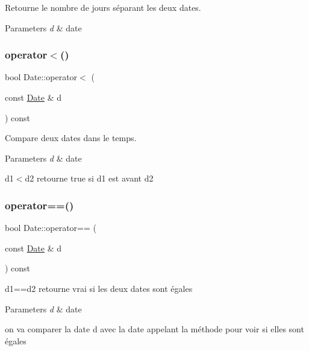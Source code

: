 Retourne le nombre de jours séparant les deux dates. 


\begin{DoxyParams}{Parameters}
{\em d} & date \\
\hline
\end{DoxyParams}
\mbox{\label{class_date_a42bf31e1ff4d0cfcf71849876e670a1b}} 
\subsubsection{\texorpdfstring{operator$<$()}{operator<()}}
{\footnotesize\ttfamily bool Date\+::operator$<$ (\begin{DoxyParamCaption}\item[{const \hyperlink{class_date}{Date} \&}]{d }\end{DoxyParamCaption}) const}



Compare deux dates dans le temps. 


\begin{DoxyParams}{Parameters}
{\em d} & date\\
\hline
\end{DoxyParams}
d1$<$d2 retourne true si d1 est avant d2 \mbox{\label{class_date_a16b90fa191e5d3080aa558fb29c676d2}} 
\subsubsection{\texorpdfstring{operator==()}{operator==()}}
{\footnotesize\ttfamily bool Date\+::operator== (\begin{DoxyParamCaption}\item[{const \hyperlink{class_date}{Date} \&}]{d }\end{DoxyParamCaption}) const}



d1==d2 retourne vrai si les deux dates sont égales 


\begin{DoxyParams}{Parameters}
{\em d} & date\\
\hline
\end{DoxyParams}
on va comparer la date d avec la date appelant la méthode pour voir si elles sont égales \mbox{\label{class_date_a7419902750e61b9473ab05ccd5ced33d}} 
